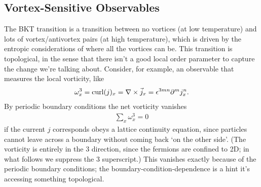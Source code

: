 \subsection{Vortex-Sensitive Observables}\label{sec:vortex}

The BKT transition is a transition between no vortices (at low temperature) and lots of vortex/antivortex pairs (at high temperature), which is driven by the entropic considerations of where all the vortices can be.
This transition is topological, in the sense that there isn't a good local order parameter to capture the change we're talking about.
Consider, for example, an observable that measures the local vorticity, like
\begin{align}
	\omega^3_x = \text{curl}(j)_x = \nabla \times \vec{j}_x = \epsilon^{3mn} \partial^m j^n_x.
\end{align}
By periodic boundary conditions the net vorticity vanishes
\begin{align}
	\sum_x \omega^3_x = 0
	\label{eq:net vorticity}
\end{align}
if the current $j$ corresponds obeys a lattice continuity equation, since particles cannot leave across a boundary without coming back `on the other side'.
(The vorticity is entirely in the 3 direction, since the fermions are confined to 2D; in what follows we suppress the 3 superscript.)
This vanishes exactly because of the periodic boundary conditions; the boundary-condition-dependence is a hint it's accessing something topological.

